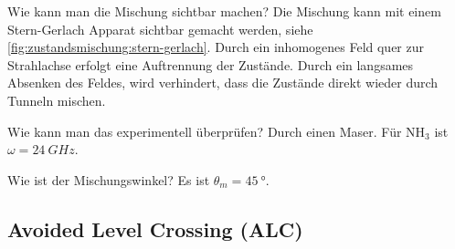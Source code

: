 \begin{fquestion}{Wie kann man die Mischung sichtbar machen?}
    Die Mischung kann mit einem Stern-Gerlach Apparat sichtbar gemacht werden, siehe \autoref{fig:zustandsmischung:stern-gerlach}. 
    Durch ein inhomogenes Feld quer zur Strahlachse erfolgt eine Auftrennung der Zustände.
    Durch ein langsames Absenken des Feldes, wird verhindert, dass die Zustände direkt wieder durch Tunneln mischen.
\end{fquestion}

\begin{fquestion}{Wie kann man das experimentell überprüfen?}
    Durch einen Maser.
    Für NH${}_3$ ist $\omega = \SI{24}{GHz}$.
\end{fquestion}

\begin{fquestion}{Wie ist der Mischungswinkel?}
    Es ist $\theta_m = \SI{45}{\degree}$.
\end{fquestion}

\subsection{Avoided Level Crossing (ALC)}

